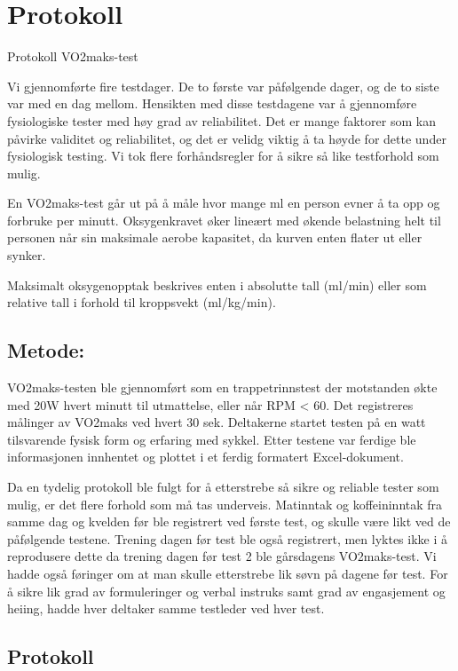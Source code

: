\documentclass[
  letterpaper,
  DIV=11,
  numbers=noendperiod]{scrreprt}
\begin{document}
\section{Protokoll}\label{protokoll}

Protokoll VO2maks-test

Vi gjennomførte fire testdager. De to første var påfølgende dager, og de
to siste var med en dag mellom. Hensikten med disse testdagene var å
gjennomføre fysiologiske tester med høy grad av reliabilitet. Det er
mange faktorer som kan påvirke validitet og reliabilitet, og det er
velidg viktig å ta høyde for dette under fysiologisk testing. Vi tok
flere forhåndsregler for å sikre så like testforhold som mulig.

En VO2maks-test går ut på å måle hvor mange ml en person evner å ta opp
og forbruke per minutt. Oksygenkravet øker lineært med økende belastning
helt til personen når sin maksimale aerobe kapasitet, da kurven enten
flater ut eller synker.

Maksimalt oksygenopptak beskrives enten i absolutte tall (ml/min) eller
som relative tall i forhold til kroppsvekt (ml/kg/min).

\subsection{Metode:}\label{metode}

VO2maks-testen ble gjennomført som en trappetrinnstest der motstanden
økte med 20W hvert minutt til utmattelse, eller når RPM \textless{} 60.
Det registreres målinger av VO2maks ved hvert 30 sek. Deltakerne startet
testen på en watt tilsvarende fysisk form og erfaring med sykkel. Etter
testene var ferdige ble informasjonen innhentet og plottet i et ferdig
formatert Excel-dokument.

Da en tydelig protokoll ble fulgt for å etterstrebe så sikre og reliable
tester som mulig, er det flere forhold som må tas underveis. Matinntak
og koffeininntak fra samme dag og kvelden før ble registrert ved første
test, og skulle være likt ved de påfølgende testene. Trening dagen før
test ble også registrert, men lyktes ikke i å reprodusere dette da
trening dagen før test 2 ble gårsdagens VO2maks-test. Vi hadde også
føringer om at man skulle etterstrebe lik søvn på dagene før test. For å
sikre lik grad av formuleringer og verbal instruks samt grad av
engasjement og heiing, hadde hver deltaker samme testleder ved hver
test.

\subsection{Protokoll}\label{protokoll-1}
\end{document}
